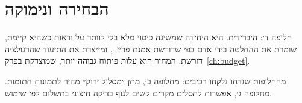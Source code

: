 \section{הבחירה ונימוקה}
\begin{keybox}[הוחלט]
חלופה ד׳: היברידית. היא היחידה שמשיגה כיסוי מלא בלי לוותר על ודאות כשהיא קיימת, שומרת את ההחלטה בידי אדם כפי שדורשת אמנת פריז~\cite{paris2023}, ומייצרת את התיעוד שהרגולציה דורשת. המחיר הוא עלות פיתוח גבוהה יותר, שמוצדקת בפרק~\ref{ch:budget}.
\end{keybox}

מהחלופות שנדחו נלקחו רכיבים: מחלופה ב׳, מתן ״מסלול ירוק״ מהיר לתמונות חתומות. מחלופה ג׳, אפשרות להסלים מקרים קשים לגוף בדיקה חיצוני בתשלום לפי שימוש.
